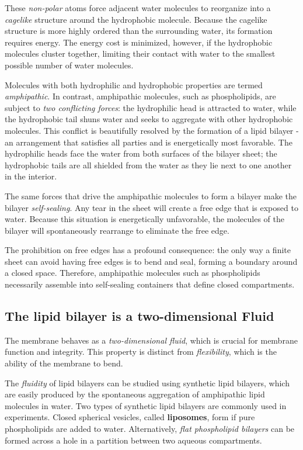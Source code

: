 These \textit{non-polar} atoms force adjacent water molecules to reorganize into a \textit{cagelike}
structure around the hydrophobic molecule. Because the
cagelike structure is more highly ordered than the surrounding water,
its formation requires energy. The energy cost is minimized, however, if
the hydrophobic molecules cluster together, limiting their contact with
water to the smallest possible number of water molecules.

Molecules with both hydrophilic and hydrophobic properties are termed
\textit{amphipathic}.
In contrast, amphipathic molecules, such as phospholipids, are subject to \textit{two conflicting forces}: the hydrophilic head is
attracted to water, while the hydrophobic tail shuns water and seeks to
aggregate with other hydrophobic molecules. This conflict is beautifully
resolved by the formation of a lipid bilayer - an arrangement that satisfies
all parties and is energetically most favorable. The hydrophilic heads
face the water from both surfaces of the bilayer sheet; the hydrophobic
tails are all shielded from the water as they lie next to one another in the
interior.

The same forces that drive the amphipathic molecules to form a bilayer
make the bilayer \textit{self-sealing}. Any tear in the sheet will create a free edge
that is exposed to water. Because this situation is energetically unfavorable,
the molecules of the bilayer will spontaneously rearrange to eliminate
the free edge.

The prohibition on free edges has a profound consequence: the only way
a finite sheet can avoid having free edges is to bend and seal, forming a
boundary around a closed space. Therefore, amphipathic
molecules such as phospholipids necessarily assemble into self-sealing
containers that define closed compartments.

\subsection{The lipid bilayer is a two-dimensional Fluid}

The membrane behaves as a \textit{two-dimensional fluid}, which is crucial for membrane function and integrity.
This property is distinct from \textit{flexibility}, which is the ability of
the membrane to bend.

The \textit{fluidity} of lipid bilayers can be studied using synthetic lipid bilayers,
which are easily produced by the spontaneous aggregation of amphipathic
lipid molecules in water. Two types of synthetic lipid bilayers are
commonly used in experiments. Closed spherical vesicles, called \textbf{liposomes},
form if pure phospholipids are added to water. Alternatively, \textit{flat
phospholipid bilayers} can be formed across a hole in a partition between
two aqueous compartments.

